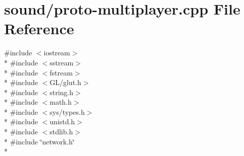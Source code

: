\hypertarget{proto-multiplayer_8cpp}{}\section{sound/proto-\/multiplayer.cpp File Reference}
\label{proto-multiplayer_8cpp}
{\ttfamily \#include $<$iostream$>$}\\*
{\ttfamily \#include $<$sstream$>$}\\*
{\ttfamily \#include $<$fstream$>$}\\*
{\ttfamily \#include $<$G\+L/glut.\+h$>$}\\*
{\ttfamily \#include $<$string.\+h$>$}\\*
{\ttfamily \#include $<$math.\+h$>$}\\*
{\ttfamily \#include $<$sys/types.\+h$>$}\\*
{\ttfamily \#include $<$unistd.\+h$>$}\\*
{\ttfamily \#include $<$stdlib.\+h$>$}\\*
{\ttfamily \#include \char`\"{}network.\+h\char`\"{}}\\*
